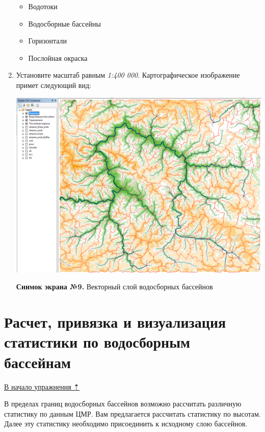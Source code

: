 \documentclass[]{book}
\providecommand{\tightlist}{%
  \setlength{\itemsep}{0pt}\setlength{\parskip}{0pt}}
\theoremstyle{definition}
\theoremstyle{definition}
\theoremstyle{definition}
\theoremstyle{remark}
\begin{document}
\begin{enumerate}
  \begin{itemize}
  \tightlist
  \item
    Водотоки
  \item
    Водосборные бассейны
  \item
    Горизонтали
  \item
    Послойная окраска
  \end{itemize}
\item
  Установите масштаб равным \emph{1:400 000}. Картографическое
  изображение примет следующий вид:

  \includegraphics{images/Ex17/image25.png}

  \textbf{Снимок экрана №9.} Векторный слой водосборных бассейнов
\end{enumerate}

\hypertarget{dem-statistics}{%
\section{Расчет, привязка и визуализация статистики по водосборным
бассейнам}\label{dem-statistics}}

\protect\hyperlink{dem-analysis}{В начало упражнения ⇡}

В пределах границ водосборных бассейнов возможно рассчитать различную
статистику по данным ЦМР. Вам предлагается рассчитать статистику по
высотам. Далее эту статистику необходимо присоединить к исходному слою
бассейнов.
\end{document}
